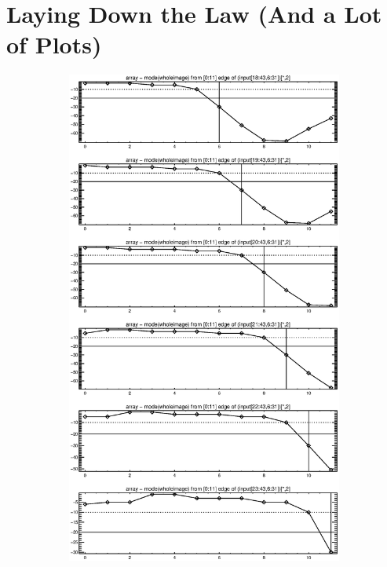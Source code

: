\documentclass[10pt]{article}
\begin{document}

\clearpage
\newpage

\section{Laying Down the Law (And a Lot of Plots)} %
\label{sec:laying_down_the_law_}

\begin{figure}[!h]
    \centering 
    \hspace{-1.0in}
    \begin{subfigure}[b]{.4\linewidth}
        \centering
        \includegraphics[width=1.4\textwidth]{../plots_tables_images/botright0.eps} 

\end{subfigure}
\end{figure}
\end{document}
